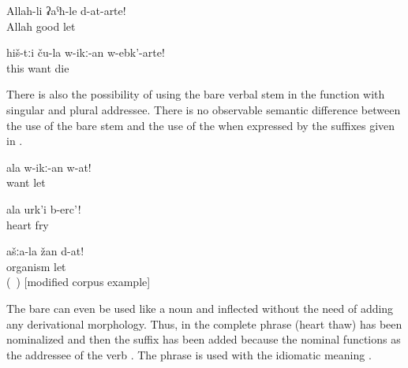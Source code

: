\begin{exe}
	\ex	\label{ex:‎‎‎May Allah leave you (plural) well}
	\gll	Allah-li	ʡaˁħ-le	d-at-arte!\\
		Allah	good	let\\
	\glt	{}

	\ex	\label{ex:‎May their beloved ones die}
	\gll	hiš-tːi	ču-la	w-ikː-an	w-ebk'-arte!\\
		this		want	die\\
	\glt	{}
\end{exe}

There is also the possibility of using the bare verbal stem in the  function  with singular and plural addressee. There is no observable semantic difference between the use of the bare stem and the use of the  when expressed by the suffixes given in .

\begin{exe}
	\ex	\label{ex:May your beloved (son) be left (in peace, alive)}
	\gll	ala	w-ikː-an	w-at!\\
			want	let\\
	\glt	{}

	\ex	\label{ex:May your heart char}
	\gll	ala	urk'i	b-erc'!\\
			heart	fry\\
	\glt	{}

	\ex	\label{ex:May your bodies and souls remain}
	\gll	ašːa-la	žan	d-at!\\
			organism	let\\
	\glt	{} (\tie\ ) [modified corpus example]
\end{exe}

The bare  can even be used like a noun and inflected without the need of adding any derivational morphology. Thus, in  the complete  phrase  (heart thaw)  has been nominalized and then the  suffix has been added because the nominal functions as the addressee of the verb . The phrase is used with the idiomatic meaning .

